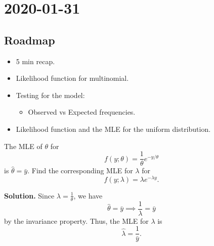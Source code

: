 \section{2020-01-31}
\subsection*{Roadmap}
\begin{itemize}
    \item 5 min recap.
    \item Likelihood function for multinomial.
    \item Testing for the model:
          \begin{itemize}
              \item Observed vs Expected frequencies.
          \end{itemize}
    \item Likelihood function and the MLE for the uniform distribution.
\end{itemize}


\begin{Example}{}{}
    The MLE of $ \theta $ for
    \[ f(y;\theta)=\frac{1}{\theta}e^{-y/\theta}  \]
    is $ \hat{\theta}=\bar{y} $. Find the corresponding MLE for
    $ \lambda $ for
    \[ f(y;\lambda)=\lambda e^{-\lambda y}. \]

    \textbf{Solution.} Since $ \lambda=\frac{1}{\theta} $, we have
    \[ \hat{\theta}=\bar{y}\implies \frac{1}{\lambda}=\bar{y} \]
    by the invariance property.
    Thus, the MLE for $ \lambda $ is
    \[ \hat{\lambda}=\frac{1}{\bar{y}}. \]
\end{Example}



